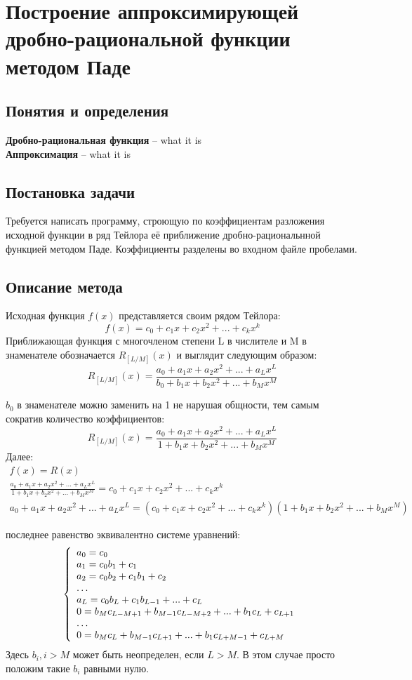 \documentclass[a4paper,14pt]{article}
\newcommand{\definition}[2]
{
	\textbf{#1} -- #2\\
}
\begin{document}
\section*{Построение аппроксимирующей дробно-рациональной функции методом Паде}
\subsection{Понятия и определения} %
\definition{Дробно-рациональная функция}{what it is}
\definition{Аппроксимация}{what it is}
\subsection{Постановка задачи} %
Требуется написать программу, строющую по коэффициентам разложения 
исходной функции в ряд Тейлора её приближение дробно-рациональнной функцией
методом Паде. Коэффициенты разделены во входном файле пробелами.
\subsection{Описание метода} %
Исходная функция $f(x)$ представляется своим рядом Тейлора:\\
\[
	f(x) = c_0 + c_1x + c_2x^2 + ... + c_kx^k
\]
Приближающая функция с многочленом степени L в числителе и M в знаменателе обозначается 
$R_{[L/M]}(x)$ и выглядит следующим образом: 
\[
	R_{[L/M]}(x) = 
	\frac{a_0 + a_1x + a_2x^2 + ... + a_Lx^L}
		{b_0 + b_1x + b_2x^2 + ... + b_Mx^M}
\]

$b_0$ в знаменателе можно заменить на 1 не нарушая общности, тем самым сократив количество коэффициентов:
\[
	R_{[L/M]}(x) = 
	\frac{a_0 + a_1x + a_2x^2 + ... + a_Lx^L}
		{1 + b_1x + b_2x^2 + ... + b_Mx^M}
\]
Далее:
\[
	\begin{array}{l}
		f(x) = R(x)\\
		\frac{a_0 + a_1x + a_2x^2 + ... + a_Lx^L}
		{1 + b_1x + b_2x^2 + ... + b_Mx^M} = 
		c_0 + c_1x + c_2x^2 + ... + c_kx^k\\
		a_0 + a_1x + a_2x^2 + ... + a_Lx^L = 
		(c_0 + c_1x + c_2x^2 + ... + c_kx^k)
		(1 + b_1x + b_2x^2 + ... + b_Mx^M)
	\end{array}
\]

последнее равенство эквивалентно системе уравнений:\\
\[
	\left\{
		\begin{array}{l}
			a_0 = c_0\\ 
			a_1 = c_0b_1 + c_1\\
			a_2 = c_0b_2 + c_1b_1 + c_2\\
			\ldots\\
			a_L = c_0b_L + c_1b_{L-1} + ... + c_L\\
			0 = b_Mc_{L-M+1} + b_{M-1}c_{L-M+2} + ... + b_1c_L + c_{L+1}\\
			\ldots\\
			0 = b_Mc_L + b_{M-1}c_{L+1} + ... + b_1c_{L+M-1} + c_{L+M}
		\end{array}
		\right. \\
	\]
Здесь $b_i, i>M$ может быть неопределен, если $L>M$. В этом случае просто 
положим такие $b_i$ равными нулю.
\end{document}
